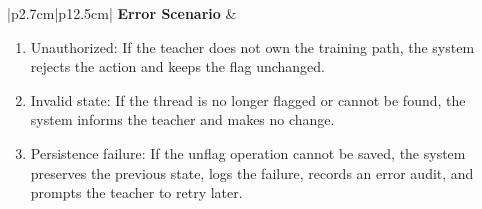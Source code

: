 \begin{table}[H]
\begin{tabular}{|p{2.7cm}|p{12.5cm}|}
        \textbf{Error Scenario} & \begin{minipage}[t]{\linewidth}
            \begin{enumerate}[topsep=0pt,itemsep=1pt,parsep=0pt,partopsep=0pt]
                \item Unauthorized: If the teacher does not own the training path, the system rejects the action and keeps the flag unchanged.
                \item Invalid state: If the thread is no longer flagged or cannot be found, the system informs the teacher and makes no change.
                \item Persistence failure: If the unflag operation cannot be saved, the system preserves the previous state, logs the failure, records an error audit, and prompts the teacher to retry later.
            \end{enumerate}
        \end{minipage} \\ \hline
    \end{tabular}
    \label{tab:teacher-resolve-flag}
\end{table}



